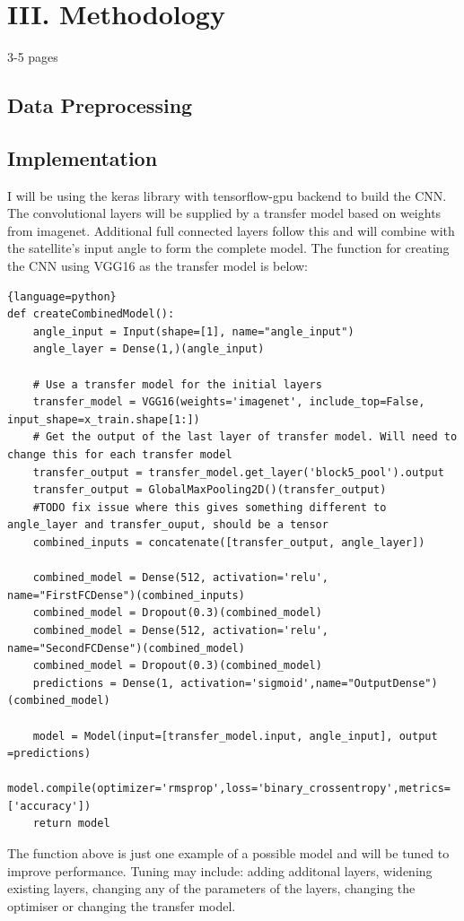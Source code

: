 \documentclass{article}
\begin{document}
\section{III. Methodology}
3-5 pages
\subsection{Data Preprocessing}
\subsection{Implementation}
I will be using the keras library with tensorflow-gpu backend to build the CNN. The convolutional layers will be supplied by a transfer model based on weights from imagenet. Additional full connected layers follow this and will combine with the satellite's input angle to form the complete model. The function for creating the CNN using VGG16 as the transfer model is below:
\begin{lstlisting}{language=python}
def createCombinedModel():
    angle_input = Input(shape=[1], name="angle_input")
    angle_layer = Dense(1,)(angle_input)
    
    # Use a transfer model for the initial layers
    transfer_model = VGG16(weights='imagenet', include_top=False, input_shape=x_train.shape[1:])
    # Get the output of the last layer of transfer model. Will need to change this for each transfer model
    transfer_output = transfer_model.get_layer('block5_pool').output
    transfer_output = GlobalMaxPooling2D()(transfer_output)
    #TODO fix issue where this gives something different to angle_layer and transfer_ouput, should be a tensor
    combined_inputs = concatenate([transfer_output, angle_layer])
    
    combined_model = Dense(512, activation='relu', name="FirstFCDense")(combined_inputs)
    combined_model = Dropout(0.3)(combined_model)
    combined_model = Dense(512, activation='relu', name="SecondFCDense")(combined_model)
    combined_model = Dropout(0.3)(combined_model)
    predictions = Dense(1, activation='sigmoid',name="OutputDense")(combined_model)
    
    model = Model(input=[transfer_model.input, angle_input], output =predictions)
    model.compile(optimizer='rmsprop',loss='binary_crossentropy',metrics=['accuracy'])
    return model
\end{lstlisting}
The function above is just one example of a possible model and will be tuned to improve performance. Tuning may include: adding additonal layers, widening existing layers, changing any of the parameters of the layers, changing the optimiser or changing the transfer model. 
\end{document}
